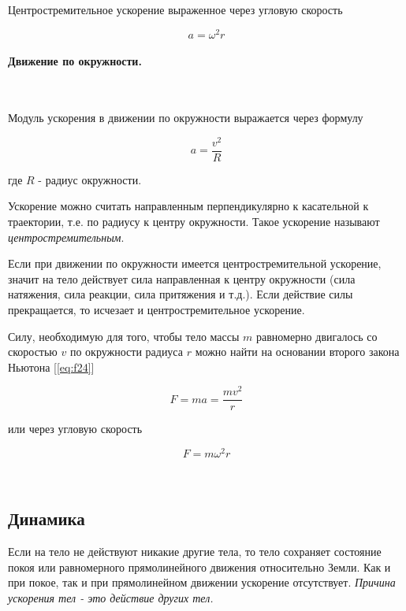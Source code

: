 \documentclass[a4paper,12pt]{article}
\begin{document}
		Центростремительное ускорение выраженное  через угловую скорость

		\begin{equation}
			a = \omega^2 r
		\end{equation}

		
		\paragraph{Движение по окружности.} \
		
		Модуль ускорения в движении по окружности выражается через формулу

		\begin{equation}
			a = \frac{v^2}{R} 
		\end{equation}

		где $R$ - радиус окружности.

		Ускорение можно считать направленным перпендикулярно к касательной к траектории,
		т.е. по радиусу к центру окружности. Такое ускорение называют 
		\textit{центростремительным}.

		Если при движении по окружности имеется центростремительной ускорение, значит на 
		тело действует сила направленная к центру окружности (сила натяжения, сила реакции, 
		сила притяжения и т.д.). Если действие силы прекращается, то исчезает и центростремительное
		ускорение.

		Силу, необходимую для того, чтобы тело массы $m$ равномерно двигалось со скоростью
		$v$ по окружности радиуса $r$ можно найти на основании второго закона Ньютона 
		[\ref{eq:f24}]

		\begin{equation}
			F = ma = \frac{mv^2}{r}
		\end{equation}

		или через угловую скорость

		\begin{equation}
			F = m \omega^2 r
		\end{equation}



		\

		\subsection*{Динамика}

		Если на тело не действуют никакие другие тела, то тело сохраняет
		состояние покоя или равномерного прямолинейного движения относительно
		Земли. Как и при покое, так и при прямолинейном движении ускорение
		отсутствует. \textit{Причина ускорения тел - это действие других тел.}
		
\end{document}
